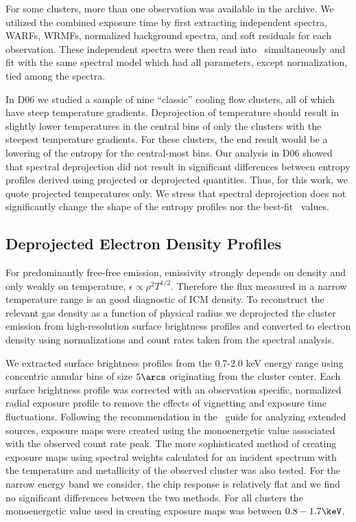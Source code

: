 For some clusters, more than one observation was available in the
archive. We utilized the combined exposure time by first extracting
independent spectra, WARFs, WRMFs, normalized background spectra, and
soft residuals for each observation. These independent spectra were
then read into \xspec\ simultaneously and fit with the same spectral
model which had all parameters, except normalization, tied among the
spectra.

In D06 we studied a sample of nine ``classic'' cooling flow clusters,
all of which have steep temperature gradients. Deprojection of
temperature should result in slightly lower temperatures in the
central bins of only the clusters with the steepest temperature
gradients. For these clusters, the end result would be a lowering of
the entropy for the central-most bins. Our analysis in D06 showed that
spectral deprojection did not result in significant differences
between entropy profiles derived using projected or deprojected
quantities. Thus, for this work, we quote projected temperatures
only. We stress that spectral deprojection does not significantly
change the shape of the entropy profiles nor the best-fit
\kna\ values.

\subsection{Deprojected Electron Density Profiles}
\label{sec:entsuppdene}

For predominantly free-free emission, emissivity strongly depends on
density and only weakly on temperature, $\epsilon \propto \rho^2
T^{1/2}$. Therefore the flux measured in a narrow temperature range is
an good diagnostic of ICM density. To reconstruct the relevant gas
density as a function of physical radius we deprojected the cluster
emission from high-resolution surface brightness profiles and
converted to electron density using normalizations and count rates
taken from the spectral analysis.

We extracted surface brightness profiles from the 0.7-2.0 keV energy
range using concentric annular bins of size $5\arcs$ originating
from the cluster center. Each surface brightness profile was corrected
with an observation specific, normalized radial exposure profile to
remove the effects of vignetting and exposure time
fluctuations. Following the recommendation in the \ciao\ guide for
analyzing extended sources, exposure maps were created using the
monoenergetic value associated with the observed count rate peak. The
more sophisticated method of creating exposure maps using spectral
weights calculated for an incident spectrum with the temperature and
metallicity of the observed cluster was also tested. For the narrow
energy band we consider, the chip response is relatively flat and we
find no significant differences between the two methods. For all
clusters the monoenergetic value used in creating exposure maps was
between $0.8-1.7\keV$.

